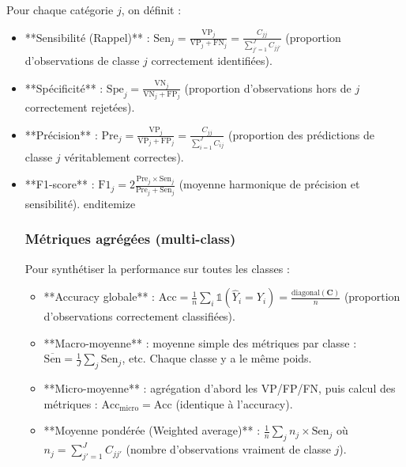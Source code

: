 \documentclass[12pt,a4paper]{article}
\begin{document}
Pour chaque catégorie $j$, on définit :
\begin{itemize}
    \item **Sensibilité (Rappel)** : $\text{Sen}_j = \frac{\text{VP}_j}{\text{VP}_j + \text{FN}_j} = \frac{C_{jj}}{\sum_{j'=1}^J C_{jj'}}$ (proportion d'observations de classe $j$ correctement identifiées).
    
    \item **Spécificité** : $\text{Spe}_j = \frac{\text{VN}_j}{\text{VN}_j + \text{FP}_j}$ (proportion d'observations hors de $j$ correctement rejetées).
    
    \item **Précision** : $\text{Pre}_j = \frac{\text{VP}_j}{\text{VP}_j + \text{FP}_j} = \frac{C_{jj}}{\sum_{i=1}^J C_{ij}}$ (proportion des prédictions de classe $j$ véritablement correctes).
    
    \item **F1-score** : $\text{F1}_j = 2 \frac{\text{Pre}_j \times \text{Sen}_j}{\text{Pre}_j + \text{Sen}_j}$ (moyenne harmonique de précision et sensibilité).
end{itemize}

\subsubsection{Métriques agrégées (multi-class)}

Pour synthétiser la performance sur toutes les classes :
\begin{itemize}
    \item **Accuracy globale** : $\text{Acc} = \frac{1}{n} \sum_i \mathbb{1}(\widehat{Y}_i = Y_i) = \frac{\text{diagonal}(\mathbf{C})}{n}$ (proportion d'observations correctement classifiées).
    
    \item **Macro-moyenne** : moyenne simple des métriques par classe : $\overline{\text{Sen}} = \frac{1}{J}\sum_j \text{Sen}_j$, etc. Chaque classe y a le même poids.
    
    \item **Micro-moyenne** : agrégation d'abord les VP/FP/FN, puis calcul des métriques : $\text{Acc}_\text{micro} = \text{Acc}$ (identique à l'accuracy).  
    
    \item **Moyenne pondérée (Weighted average)** : $\frac{1}{n}\sum_j n_j \times \text{Sen}_j$ où $n_j = \sum_{j'=1}^J C_{jj'}$ (nombre d'observations vraiment de classe $j$).
\end{itemize}


\end{itemize}
\end{document}

